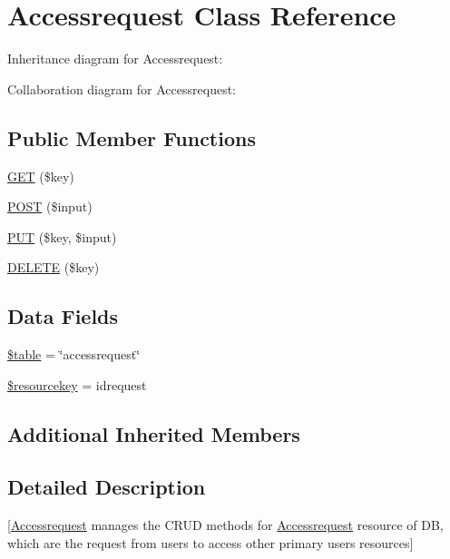 \hypertarget{class_accessrequest}{}\section{Accessrequest Class Reference}
\label{class_accessrequest}


Inheritance diagram for Accessrequest\+:


Collaboration diagram for Accessrequest\+:
\subsection*{Public Member Functions}
\begin{DoxyCompactItemize}
\item 
\mbox{\hyperlink{class_accessrequest_a7490aac9922424f1e605adf9cda9a78b}{G\+ET}} (\$key)
\item 
\mbox{\hyperlink{class_accessrequest_aea3bf4cb6556d5b12c15f871fc0960f6}{P\+O\+ST}} (\$input)
\item 
\mbox{\hyperlink{class_accessrequest_ad17c66e0ea82e9537b258d49e61868d8}{P\+UT}} (\$key, \$input)
\item 
\mbox{\hyperlink{class_accessrequest_a10abe19fb01e7c9a2b88104cf8afc666}{D\+E\+L\+E\+TE}} (\$key)
\end{DoxyCompactItemize}
\subsection*{Data Fields}
\begin{DoxyCompactItemize}
\item 
\mbox{\hyperlink{class_accessrequest_ae8876a14058f368335baccf35af4a22b}{\$table}} = \char`\"{}accessrequest\char`\"{}
\item 
\mbox{\hyperlink{class_accessrequest_aebf9a45aba50bace51a0400cdafdd8d3}{\$resourcekey}} = \textquotesingle{}idrequest\textquotesingle{}
\end{DoxyCompactItemize}
\subsection*{Additional Inherited Members}


\subsection{Detailed Description}
\mbox{[}\mbox{\hyperlink{class_accessrequest}{Accessrequest}} manages the C\+R\+UD methods for \mbox{\hyperlink{class_accessrequest}{Accessrequest}} resource of DB, which are the request from users to access other primary users resources\mbox{]} 

